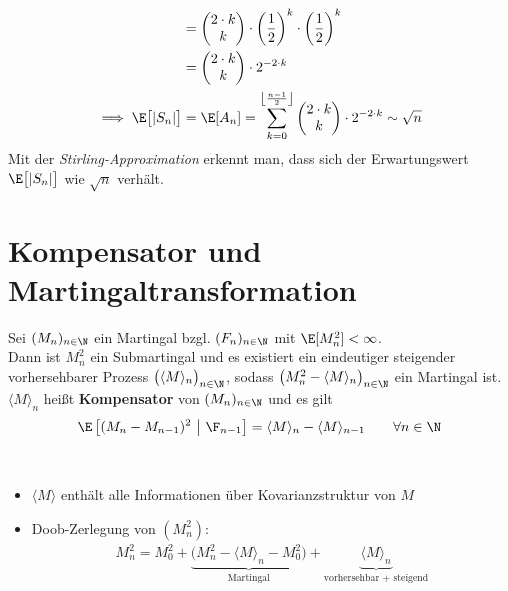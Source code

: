 \begin{beisp}
\begin{align*}
&=\begin{pmatrix}
2\cdot k\\ k
\end{pmatrix}\cdot\left(\frac{1}{2}\right)^k\cdot\left(\frac{1}{2}\right)^k\\
&=\begin{pmatrix}
2\cdot k \\ k
\end{pmatrix}\cdot 2^{-2\cdot k}\\
\implies
\E\big[|S_n|\big]&=\E[A_n]=\sum\limits_{k=0}^{\left\lfloor\frac{n-1}{2}\right\rfloor}\begin{pmatrix}
2\cdot k\\ k
\end{pmatrix}\cdot 2^{-2\cdot k}\sim\sqrt{n}
\end{align*}
Mit der \textit{Stirling-Approximation} erkennt man, dass sich der Erwartungswert $\E\big[|S_n|\big]$ wie $\sqrt{n}$ verhält.
\end{beisp}

\section{Kompensator und Martingaltransformation} %
\setcounter{satz}{3}
\begin{lemma}\label{lemma2.4}
Sei $(M_n)_{n\in\N}$ ein Martingal bzgl. $(F_n)_{n\in\N}$ mit $\E[M_n^2]<\infty$.\\
Dann ist $M_n^2$ ein Submartingal und es existiert ein eindeutiger steigender vorhersehbarer Prozess $\big(\langle M\rangle_n\big)_{n\in\N}$, sodass $\big(M_n^2-\langle M\rangle_n\big)_{n\in\N}$ ein Martingal ist. $\langle M\rangle_n$ heißt \textbf{Kompensator} von $(M_n)_{n\in\N}$ und es gilt
\begin{align}\label{eqLemma2.4}
\E\left[(M_n-M_{n-1})^2~\big|~\F_{n-1}\right]=\langle M\rangle_n-\langle M\rangle_{n-1}\qquad\forall n\in\N
\end{align}
\end{lemma}

\begin{bemerkung}\ %
\begin{itemize}
\item $\langle M\rangle$ enthält alle Informationen über Kovarianzstruktur von $M$
\item Doob-Zerlegung von $(M_n^2)$:
\begin{align*}
M_n^2=M_0^2+\underbrace{\big(M_n^2-\langle M\rangle_n-M_0^2\big)}_{\text{Martingal}}+\underbrace{\langle M\rangle_n}_{\text{vorhersehbar + steigend}}
\end{align*}
\end{itemize}
\end{bemerkung}

